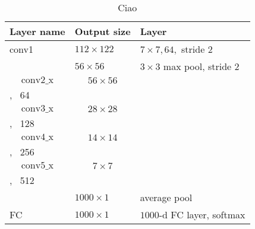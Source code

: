 \begin{table}
    \centering
    \begingroup
    
    \begin{tabular}{>{\centering\arraybackslash}p{}|>{\centering\arraybackslash}p{}|>{\centering\arraybackslash}p{}}
        \hline
        \textbf{Layer name} & \textbf{Output size} & \textbf{Layer} \\
        \hline
        \hline
        conv1 & $112 \times 122$ & $7 \times 7, 64,$ stride $2$ \\
        \hline
          & $56 \times 56$ & $3 \times 3$ max pool, stride $2$ \\
        \hline

        \[ \textrm{conv2\char`_x} \] &  \[56 \times 56 \] & \[\left[ \begin{array}{c} 3 \times 3, \, 64\\ 3 \times 3, \, 64  \end{array}\right] \times 3 \]\\
        \hline

        \[ \textrm{conv3\char`_x} \] &  \[28 \times 28 \] & \[\left[ \begin{array}{c} 3 \times 3, \, 128\\ 3 \times 3, \, 128  \end{array}\right] \times 4 \]\\
        \hline

        \[ \textrm{conv4\char`_x} \] &  \[14 \times 14 \] & \[\left[ \begin{array}{c} 3 \times 3, \, 256\\ 3 \times 3, \, 256  \end{array}\right] \times 6 \]\\
        \hline

        \[ \textrm{conv5\char`_x} \] &  \[7 \times 7 \] & \[\left[ \begin{array}{c} 3 \times 3, \, 512\\ 3 \times 3, \, 512  \end{array}\right] \times 3 \]\\
        \hline
        & $1000 \times 1$ & average pool \\
        \hline
        FC & $1000 \times 1$ & $1000$-d FC layer, softmax \\
        \hline
        \end{tabular}
    \endgroup
    \caption{Ciao}
\end{table}



